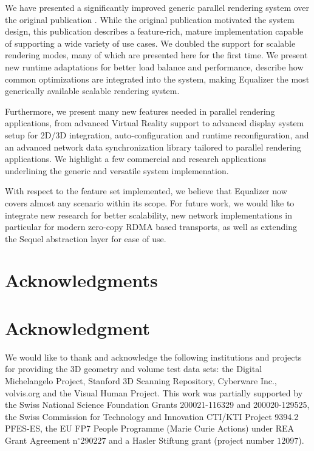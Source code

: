 \documentclass[10pt,journal,compsoc]{IEEEtran}
\begin{document}
We have presented a significantly improved generic parallel rendering system
over the original publication \cite{EMP:09}. While the original publication
motivated the system design, this publication describes a feature-rich, mature
implementation capable of supporting a wide variety of use cases. We doubled the
support for scalable rendering modes, many of which are presented here for the
first time. We present new runtime adaptations for better load balance and
performance, describe how common optimizations are integrated into the system,
making Equalizer the most generically available scalable rendering system.

Furthermore, we present many new features needed in parallel rendering
applications, from advanced Virtual Reality support to advanced display system
setup for 2D/3D integration, auto-configuration and runtime reconfiguration, and
an advanced network data synchronization library tailored to parallel rendering
applications. We highlight a few commercial and research applications
underlining the generic and versatile system implemenation.

With respect to the feature set implemented, we believe that Equalizer now
covers almost any scenario within its scope. For future work, we would like to
integrate new research for better scalability, new network implementations in
particular for modern zero-copy RDMA based transports, as well as extending the
Sequel abstraction layer for ease of use.

\appendices
\ifCLASSOPTIONcompsoc
  \section*{Acknowledgments}
\else
  \section*{Acknowledgment}
\fi
We would like to thank and acknowledge the following institutions and projects
for providing the 3D geometry and volume test data sets: the Digital
Michelangelo Project, Stanford 3D Scanning Repository, Cyberware Inc.,
volvis.org and the Visual Human Project.
%
This work was partially supported by
the Swiss National Science Foundation Grants 200021-116329 and 200020-129525,
the Swiss Commission for Technology and Innovation CTI/KTI Project 9394.2 PFES-ES,
the EU FP7 People Programme (Marie Curie Actions) under REA Grant Agreement n$^{\circ}290227$ and
a Hasler Stiftung grant (project number $12097$).
\end{document}
